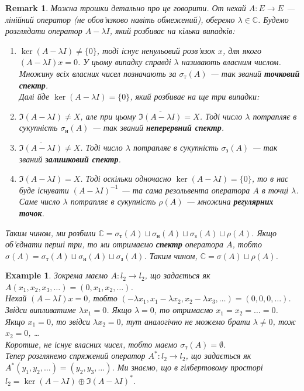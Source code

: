 \documentclass[a4paper, 10pt]{article}
\theoremstyle{theoremdd}
\theoremstyle{theoremdd}
\theoremstyle{theoremdd}
\theoremstyle{theoremdd}
\newtheorem{example}[theorem]{Example}
\theoremstyle{theoremdd}
\theoremstyle{theoremdd}
\newtheorem{remark}[theorem]{Remark}
\theoremstyle{theoremdd}
\theoremstyle{theoremdd}
\begin{document}
\begin{remark}
Можна трошки детально про це говорити. От нехай $A \colon E \to E$ --- лінійний оператор (не обов'язково навіть обмежений), оберемо $\lambda \in \mathbb{C}$. Будемо розглядати оператор $A - \lambda I$, який розбиває на кілька випадків:
\begin{enumerate}[wide=0pt,label={\arabic*)}]
\item $\ker (A-\lambda I) \neq \{0\}$, тоді існує ненульовий розв'язок $x$, для якого $(A-\lambda I)x = 0$. У цьому випадку справді $\lambda$ називають власним числом. Множину всіх власних чисел позначають за $\sigma_{\text{т}}(A)$ --- так званий \textbf{точковий спектр}.
\bigskip \\
Далі йде $\ker(A-\lambda I) = \{0\}$, який розбиває на ще три випадки:
\item $\Im(A-\lambda I) \neq X$, але при цьому $\overline{\Im(A-\lambda I)} = X$. Тоді число $\lambda$ потрапляє в сукупність $\sigma_{\text{н}}(A)$ --- так званий \textbf{неперервний спектр}.
\item $\overline{\Im(A-\lambda I)} \neq X$. Тоді число $\lambda$ потрапляє в сукупність $\sigma_{\text{з}}(A)$ --- так званий \textbf{залишковий спектр}.
\item $\Im(A-\lambda I) = X$. Тоді оскільки одночасно $\ker(A-\lambda I) = \{0\}$, то в нас буде існувати $(A-\lambda I)^{-1}$ --- та сама резольвента оператора $A$ в точці $\lambda$. Саме число $\lambda$ потрапляє в сукупність $\rho(A)$ --- множина \textbf{регулярних точок}.
\end{enumerate}
Таким чином, ми розбили $\mathbb{C} = \sigma_{\text{т}}(A) \sqcup \sigma_{\text{н}}(A) \sqcup \sigma_{\text{з}}(A) \sqcup \rho(A)$. Якщо об'єднати перші три, то ми отримаємо \textbf{спектр} оператора $A$, тобто $\sigma(A) = \sigma_{\text{т}}(A) \sqcup \sigma_{\text{н}}(A) \sqcup \sigma_{\text{з}}(A)$. Таким чином, $\mathbb{C} = \sigma(A) \sqcup \rho(A)$.
\end{remark}

\begin{example}
Зокрема маємо $A \colon l_2 \to l_2$, що задається як $A(x_1,x_2,x_3,\dots) = (0,x_1,x_2,\dots)$.\\
Нехай $(A-\lambda I)x = 0$, тобто $(-\lambda x_1, x_1 - \lambda x_2, x_2 - \lambda x_3, \dots) = (0,0,0,\dots)$. Звідси випливатиме $\lambda x_1 = 0$. Якщо $\lambda = 0$, то отримаємо $x_1 = x_2 = \dots = 0$. Якщо $x_1 = 0$, то звідси $\lambda x_2 = 0$, тут аналогічно не можемо брати $\lambda \neq 0$, тож $x_2 = 0$, \dots\\
Коротше, не існує власних чисел, тобто маємо $\sigma_{\text{т}}(A) = \emptyset$.\\
Тепер розглянемо спряжений оператор $A^* \colon l_2 \to l_2$, що задається як $A^*(y_1,y_2,\dots) = (y_2,y_3,\dots)$. Ми знаємо, що в гілбертовому просторі $l_2 = \ker (A-\lambda I) \oplus \Im(A-\lambda I)^*$.
\end{example}
\end{document}
